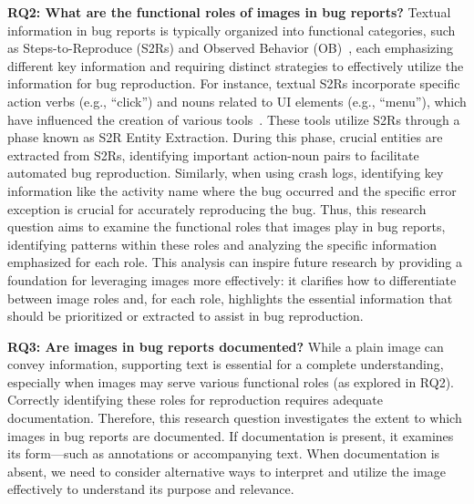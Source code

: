 \noindent
\textbf{RQ2: What are the functional roles of images in bug reports?} 
Textual information in bug reports is typically organized into functional categories, such as Steps-to-Reproduce (S2Rs) and Observed Behavior (OB)~\cite{chaparroAssessingQualitySteps2019,chaparroDetectingMissingInformation2017},
each emphasizing different key information and requiring distinct strategies to effectively utilize the information for bug reproduction. For instance, textual S2Rs incorporate specific action verbs (e.g., “click”) and nouns related to UI elements (e.g., “menu”), which have influenced the creation of various tools~\cite{zhao2019recdroid, feng2024prompting, zhang2023automatically}. These tools utilize S2Rs through a phase known as S2R Entity Extraction. During this phase, crucial entities are extracted from S2Rs, identifying important action-noun pairs to facilitate automated bug reproduction.
%
Similarly, when using crash logs, identifying key information like the activity name where the bug occurred and the specific error exception is crucial for accurately reproducing the bug.
%
Thus, this research question aims to examine the functional roles that images play in bug reports, identifying patterns within these roles and analyzing the specific information emphasized for each role. This analysis can inspire future research by providing a foundation for leveraging images more effectively: it clarifies how to differentiate between image roles and, for each role, highlights the essential information that should be prioritized or extracted to assist in bug reproduction.

\noindent
\textbf{RQ3: Are images in bug reports documented?} 
While a plain image can convey information, supporting text is essential for a complete understanding, especially when images may serve various functional roles (as explored in RQ2). Correctly identifying these roles for reproduction requires adequate documentation.
%
Therefore, this research question investigates the extent to which images in bug reports are documented. If documentation is present, it examines its form—such as annotations or accompanying text. When documentation is absent, we need to consider alternative ways to interpret and utilize the image effectively to understand its purpose and relevance.
%
%


